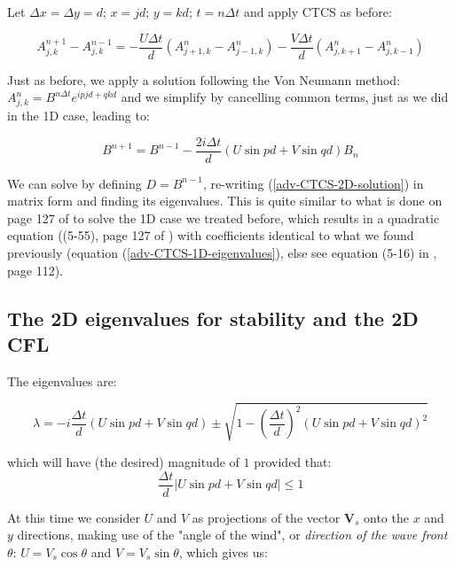 	Let $\Delta x = \Delta y =d$; $x=jd$; $y=kd$; $t=n \Delta t$ and apply CTCS as before:
	
	\begin{equation}
		{A_{j,k}^{n+1}-A_{j,k}^{n-1}} = - \frac{ U \Delta t}{d} \left( A_{j+1,k}^{n} - A_{j-1,k}^{n}  \right) - \frac{ V \Delta t}{d} \left( A_{j,k+1}^{n} - A_{j,k-1}^{n}  \right) 
		\label{adv-CTCS-2D}
	\end{equation}
	
	Just as before, we apply a solution following the Von Neumann method: ${A_{j,k}^{n}=B^{n \Delta t} e^{i pjd + qkd }}$ and we simplify by cancelling common terms, just as we did in the 1D case, leading to:
	
	\begin{equation}
		B^{n+1}  =  B^{n-1}  - \frac{2 i \Delta t}{d}  \left ( U \sin pd + V \sin qd \right) B_n
		\label{adv-CTCS-2D-solution}
	\end{equation}
	
	We can solve by defining $D=B^{n-1}$, re-writing (\ref{adv-CTCS-2D-solution}) in matrix form and finding its eigenvalues. This is quite similar to what is done on page 127 of \cite{Haltiner-Williams-book} to solve the 1D case we treated before, which results in a quadratic equation ((5-55), page 127 of \cite{Haltiner-Williams-book}) with coefficients identical to what we found previously (equation (\ref{adv-CTCS-1D-eigenvalues}), else see equation (5-16) in \cite{Haltiner-Williams-book}, page 112).

\subsection{The 2D eigenvalues for stability and the 2D CFL}

	The eigenvalues are:
	
	\begin{equation}
		\lambda = -i \frac{ \Delta t}{d}  \left ( U \sin pd + V \sin qd \right) \pm \sqrt { 1-  (\frac{ \Delta t}{d})^2  \left ( U \sin pd + V \sin qd \right) ^2 }
	\end{equation}
	
	which will have (the desired) magnitude of $1$ provided that: 
	\begin{equation}
		\frac{ \Delta t}{d}  \left | U \sin pd + V \sin qd \right | \leq 1
	\end{equation}
	
	At this time we consider $U$ and $V$ as projections of the vector $\mathbf{V}_s$ onto the $x$ and $y$ directions, making use of the "angle of the wind", or \emph{direction of the wave front} $\theta$: $U=V_s \cos \theta$ and $V=V_s \sin \theta$, which gives us:
	
